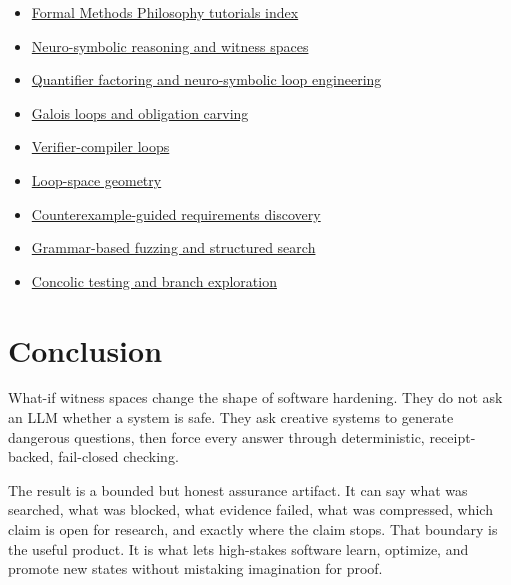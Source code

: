 \documentclass[11pt]{article}
\begin{document}
\begin{itemize}
\item \href{https://thedarklightx.github.io/Formal\textbackslash{}\_Methods\textbackslash{}\_Philosophy/tutorials/}{Formal Methods Philosophy tutorials index}
\item \href{https://thedarklightx.github.io/Formal\textbackslash{}\_Methods\textbackslash{}\_Philosophy/tutorials/neuro-symbolic-witness-spaces/}{Neuro-symbolic reasoning and witness spaces}
\item \href{https://thedarklightx.github.io/Formal\textbackslash{}\_Methods\textbackslash{}\_Philosophy/tutorials/quantifier-factoring-and-neuro-symbolic-loops/}{Quantifier factoring and neuro-symbolic loop engineering}
\item \href{https://thedarklightx.github.io/Formal\textbackslash{}\_Methods\textbackslash{}\_Philosophy/tutorials/galois-loops-and-obligation-carving/}{Galois loops and obligation carving}
\item \href{https://thedarklightx.github.io/Formal\textbackslash{}\_Methods\textbackslash{}\_Philosophy/tutorials/verifier-compiler-loops/}{Verifier-compiler loops}
\item \href{https://thedarklightx.github.io/Formal\textbackslash{}\_Methods\textbackslash{}\_Philosophy/tutorials/loop-space-geometry/}{Loop-space geometry}
\item \href{https://thedarklightx.github.io/Formal\textbackslash{}\_Methods\textbackslash{}\_Philosophy/tutorials/counterexample-guided-requirements-discovery/}{Counterexample-guided requirements discovery}
\item \href{https://thedarklightx.github.io/Formal\textbackslash{}\_Methods\textbackslash{}\_Philosophy/tutorials/grammar-based-fuzzing-and-structured-search/}{Grammar-based fuzzing and structured search}
\item \href{https://thedarklightx.github.io/Formal\textbackslash{}\_Methods\textbackslash{}\_Philosophy/tutorials/concolic-testing-and-branch-exploration/}{Concolic testing and branch exploration}
\end{itemize}
\section{Conclusion}
What-if witness spaces change the shape of software hardening. They do not ask an LLM whether a system is safe. They ask creative systems to generate dangerous questions, then force every answer through deterministic, receipt-backed, fail-closed checking.

The result is a bounded but honest assurance artifact. It can say what was searched, what was blocked, what evidence failed, what was compressed, which claim is open for research, and exactly where the claim stops. That boundary is the useful product. It is what lets high-stakes software learn, optimize, and promote new states without mistaking imagination for proof.
\end{document}
